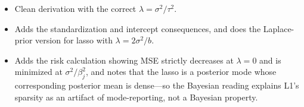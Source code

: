\begin{interviewq}

\goodgreat
\begin{itemize}
    \item {} Clean derivation with the correct $\lambda = \sigma^2/\tau^2$.
    \item {} Adds the standardization and intercept consequences, and does the Laplace-prior version for lasso with $\lambda = 2\sigma^2/b$.
    \item {} Adds the risk calculation showing MSE strictly decreases at $\lambda = 0$ and is minimized at $\sigma^2/\beta_j^2$, and notes that the lasso is a posterior mode whose corresponding posterior mean is dense---so the Bayesian reading explains L1's sparsity as an artifact of mode-reporting, not a Bayesian property.
\end{itemize}

\end{interviewq}


